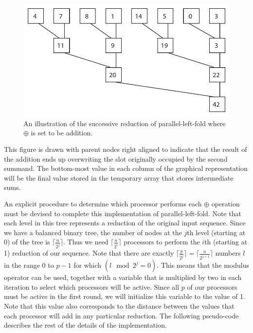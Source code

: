 \documentclass[12pt,twoside]{reedthesis}
\begin{document}
\begin{figure}[h]
\includegraphics{parallel-left-fold-tree.pdf}
\caption{An illustration of the successive reduction of
  parallel-left-fold where $\oplus$ is set to be addition.}
\end{figure}
\vspace{1pc}

This figure is drawn with parent nodes right aligned to indicate that
the result of the addition ends up overwriting the slot originally
occupied by the second summand. The bottom-most value in each column
of the graphical representation will be the final value stored in the
temporary array that stores intermediate sums.

An explicit procedure to determine which processor performs each
$\oplus$ operation must be devised to complete this implementation of
parallel-left-fold. Note that each level in this tree represents a reduction of the original input
sequence. Since we have a balanced binary tree, the number of nodes at
the $j$th level (starting at 0) of the tree is  $\lceil \frac{n}{2^j}
\rceil$. Thus we need $\lceil \frac{n}{2^i}\rceil$ processors to
perform the $i$th (starting at 1) reduction of our sequence.
Note that there are exactly $\lceil \frac{p}{2^j} \rceil = \lceil
\frac{n}{2^{j+1}} \rceil$ numbers $l$ in the range 0 to $p-1$ for
which $(l \mod 2^j = 0)$. This means that the modulus operator can be
used, together with a variable that is multiplied by two in each
iteration to select which processors will be active. Since all $p$ of
our processors must be active in the first round, we will initialize
this variable to the value of 1. Note that this value also corresponds
to the distance between the values that each processor will add in any
particular reduction. The following pseudo-code describes the rest of
the details of the implementation.
\end{document}
